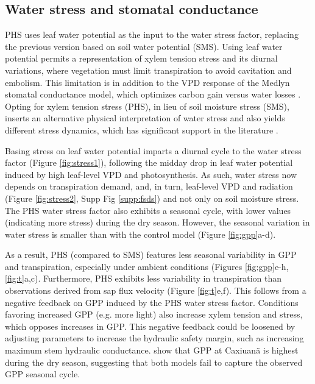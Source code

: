 \documentclass[draft,linenumbers]{agujournal}
\begin{document}
\subsection{Water stress and stomatal conductance}
    \label{sect:stress}
    PHS uses leaf water potential as the input to the water stress factor, 
    replacing the previous version based on soil water potential (SMS).
    Using leaf water potential permits a representation of xylem tension stress and its diurnal variations, where vegetation must limit transpiration to avoid cavitation and embolism.
    This limitation is in addition to the VPD response of the Medlyn stomatal conductance model,
     which optimizes carbon gain versus water losses \citep{medlyn2011}.
    Opting for xylem tension stress (PHS), in lieu of soil moisture stress (SMS), inserts an alternative physical interpretation of water stress and also yields different stress dynamics, which has significant support in the literature \citep{novick2016a,sperry2017}.
    
    Basing stress on leaf water potential imparts a diurnal cycle to the water stress factor (Figure \ref{fig:stress1}), following the midday drop in leaf water potential induced by high leaf-level VPD and photosynthesis.
    As such, water stress now depends on transpiration demand, and, in turn, leaf-level VPD and radiation (Figure \ref{fig:stress2}, Supp Fig \ref{supp:fsds}) and not only on soil moisture stress.
    The PHS water stress factor also exhibits a seasonal cycle, with lower values (indicating more stress) during the dry season.  
    However, the seasonal variation in water stress is smaller than with the control model (Figure \ref{fig:gpp}a-d).
    
    As a result, PHS (compared to SMS) features less seasonal variability in GPP and transpiration, especially under ambient conditions (Figures \ref{fig:gpp}e-h, \ref{fig:t}a,c).
    Furthermore, PHS exhibits less variability in transpiration than observations derived from sap flux velocity (Figure \ref{fig:t}e,f).
    This follows from a negative feedback on GPP induced by the PHS water stress factor.
    Conditions favoring increased GPP (e.g. more light) also increase xylem tension and stress, which opposes increases in GPP.
    This negative feedback could be loosened by adjusting parameters to increase the hydraulic safety margin, such as increasing maximum stem hydraulic conductance.
        \cite{restrepo2017} show that GPP at Caxiuan\~a is highest during the dry season, suggesting that both models fail to capture the observed GPP seasonal cycle.
\end{document}
